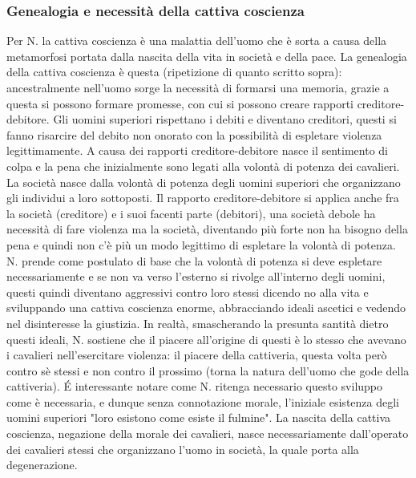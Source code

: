 \documentclass[10pt,a4paper]{article}
\begin{document}
\subsubsection{Genealogia e necessità della cattiva coscienza}
Per N. la cattiva coscienza è una malattia dell'uomo che è sorta a causa della metamorfosi portata dalla nascita della vita in società e della pace. La genealogia della cattiva coscienza è questa (ripetizione di quanto scritto sopra): ancestralmente nell'uomo sorge la necessità di formarsi una memoria, grazie a questa si possono formare promesse, con cui si possono creare rapporti creditore-debitore. Gli uomini superiori rispettano i debiti e diventano creditori, questi si fanno risarcire del debito non onorato con la possibilità di espletare violenza legittimamente. A causa dei rapporti creditore-debitore nasce il sentimento di colpa e la pena che inizialmente sono legati alla volontà di potenza dei cavalieri. La società nasce dalla volontà di potenza degli uomini superiori che organizzano gli individui a loro sottoposti. Il rapporto creditore-debitore si applica anche fra la società (creditore) e i suoi facenti parte (debitori), una società debole ha necessità di fare violenza ma  la società, diventando più forte non ha bisogno della pena e quindi non c'è più un modo legittimo di espletare la volontà di potenza. N. prende come postulato di base che la volontà di potenza si deve espletare necessariamente e se non va verso l'esterno si rivolge all'interno degli uomini, questi quindi diventano aggressivi contro loro stessi dicendo no alla vita e sviluppando una cattiva coscienza enorme, abbracciando ideali ascetici e vedendo nel disinteresse la giustizia. In realtà, smascherando la presunta santità dietro questi ideali, N. sostiene che il piacere all'origine di questi è lo stesso che avevano i cavalieri nell'esercitare violenza: il piacere della cattiveria, questa volta però contro sè stessi e non contro il prossimo (torna la natura dell'uomo che gode della cattiveria). \'E interessante notare come N. ritenga necessario questo sviluppo come è necessaria, e dunque senza connotazione morale, l'iniziale esistenza degli uomini superiori "loro esistono come esiste il fulmine". La nascita della cattiva coscienza, negazione della morale dei cavalieri, nasce necessariamente dall'operato dei cavalieri stessi che organizzano l'uomo in società, la quale porta alla degenerazione.
\end{document}
